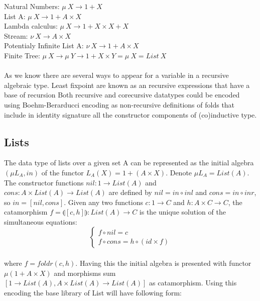 \documentclass[11pt,oneside]{article}
\begin{document}
\noindent Natural Numbers: $\mu\ X \rightarrow 1 + X$\\
List A: $\mu\ X \rightarrow 1 + A \times X$\\
Lambda calculus: $\mu\ X \rightarrow 1 + X \times X + X$\\
Stream: $\nu\ X \rightarrow A \times X$\\
Potentialy Infinite List A: $\nu\ X \rightarrow 1 + A \times X$\\
Finite Tree: $\mu\ X \rightarrow \mu\ Y \rightarrow 1 + X \times Y = \mu\ X = List\ X$\\

\paragraph{}
As we know there are several ways to appear for a variable in a recursive algebraic type.
Least fixpoint are known as an recursive expressions that have a base of recursion
Both recursive and corecursive datatypes could be encoded using Boehm-Berarducci encoding
as  non-recursive definitions of folds that include in identity signature all the
constructor components of (co)inductive type.

\subsection{Lists}
The data type of lists over a given set A can be represented as the initial algebra
$(\mu L_A, in)$ of the functor $L_A(X) = 1 + (A \times X)$. Denote $\mu L_A = List(A)$.
The constructor functions $nil: 1 \rightarrow List(A)$ and
$cons: A \times List(A) \rightarrow List(A)$ are defined by
$nil = in \circ inl$ and $cons = in \circ inr$, so $in = [nil,cons]$.
Given any two functions $c: 1 \rightarrow C$ and $h: A \times C \rightarrow C$,
the catamorphism $f = \llparenthesis [c,h] \rrparenthesis : List(A) \rightarrow C$
is the unique solution of the simultaneous equations:
\vspace{0.3cm}
$$
\begin{cases}
  f \circ nil  = c \\
  f \circ cons = h \circ (id \times f)
\end{cases}
$$

\paragraph{}
where $f = foldr(c,h)$. Having this the initial algebra is presented with functor
$\mu (1 + A \times X)$ and morphisms sum $[1 \rightarrow List(A), A \times List(A) \rightarrow List(A)]$
as catamorphism. Using this encoding the base library of List will have following form:
\end{document}

